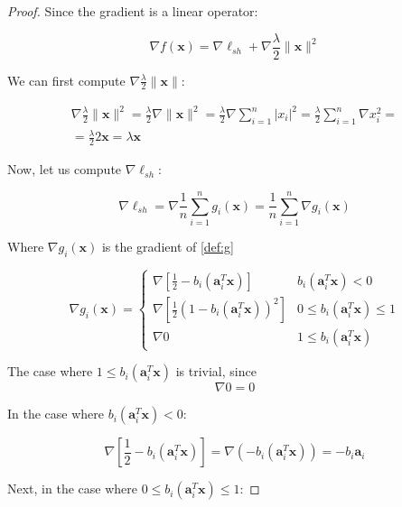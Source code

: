 \documentclass[12pt]{article}
\newcommand{\xb}{\mathbf{x}}
\newcommand{\ab}{\mathbf{a}}
\newcommand{\abi}{\ab_i}
\newcommand{\xnorm}{\lVert \mathbf{\xb} \rVert}
\newcommand{\sumin}{\sum_{i = 1}^n}
\newcommand{\ellsh}{\ell_{sh}}
\newcommand{\ax}{\abi^T\xb}
\begin{document}
\begin{proof}
Since the gradient is a linear operator:

\begin{equation}
    \nabla f(\xb) = \nabla \ellsh + \nabla \frac{\lambda}{2} \xnorm ^ 2
\end{equation}

We can first compute $\nabla \frac{\lambda}{2} \xnorm$:

\begin{gather}
    \nabla \frac{\lambda}{2} \xnorm ^ 2 =
    \frac{\lambda}{2} \nabla \xnorm ^ 2 =
    \frac{\lambda}{2} \nabla \sumin |x_i|^2 = \nonumber
    \frac{\lambda}{2} \sumin \nabla x_i^2 = \\
     = \frac{\lambda}{2}2\xb =
    \lambda \xb \label{eq:grad_lambda}
\end{gather}

Now, let us compute $\nabla \ellsh$:

\begin{equation}
    \nabla \ellsh = \nabla \frac{1}{n} \sumin g_i(\xb) = \frac{1}{n} \sumin \nabla g_i(\xb)
\end{equation}

Where $\nabla g_i(\xb)$ is the gradient of \eqref{def:g}

\begin{equation}
    \nabla g_i(\xb) = \begin{cases}
        \nabla \left [\frac{1}{2} - b_i(\ax)\right]         & b_i(\ax) < 0 \\
        \nabla \left [\frac{1}{2}(1 - b_i(\ax))^2\right]    & 0 \leq b_i(\ax) \leq 1 \\
        \nabla 0                                            & 1 \le b_i(\ax)
    \end{cases}
\end{equation}

The case where $1 \le b_i(\ax)$ is trivial, since
\begin{equation} \label{eq:grad_0_case}
    \nabla 0 = 0
\end{equation}

In the case where $b_i(\ax) < 0$:

\begin{equation} \label{eq:grad_linear_case}
    \nabla \left [\frac{1}{2} - b_i(\ax)\right] = \nabla (-b_i(\ax)) = -b_i\abi
\end{equation}

Next, in the case where $0 \leq b_i(\ax) \leq 1$:


\end{proof}
\end{document}
